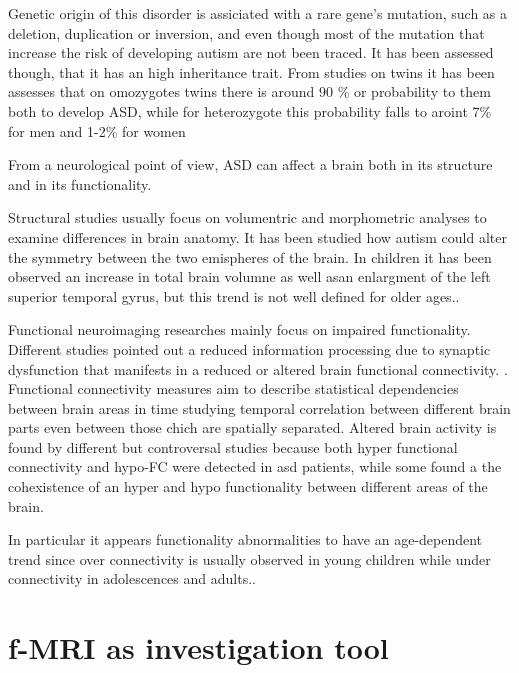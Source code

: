 \documentclass[10pt]{report}
\begin{document}
Genetic origin of this disorder is assiciated with a rare gene's mutation, such as a deletion, duplication or inversion, and even though most of the mutation that increase the risk of developing autism are not been traced.
It has been assessed though, that it has an high inheritance trait. From studies on twins it has been assesses that on omozygotes twins there is around 90 \% or probability to them both to develop ASD, while for heterozygote this probability falls to aroint 7\% for men and 1-2\% for women
\cite{freitag-2007}

From a neurological point of view, ASD can affect a brain both in its structure and in its functionality.

Structural studies usually focus on volumentric and morphometric analyses to examine differences in brain anatomy.
It has been studied how autism could alter the symmetry between the two emispheres \cite{postema2019} of the brain. In children it has been observed an increase in total brain volumne as well asan enlargment of the left superior temporal gyrus, but this trend is not well defined for older ages.\cite{riddler-2017}.


Functional neuroimaging researches mainly focus on impaired functionality. Different studies pointed out a reduced information processing due to synaptic dysfunction that manifests in a reduced or altered brain functional connectivity. \cite{spera-2019}.
Functional connectivity measures aim to describe statistical dependencies between brain areas in time studying temporal correlation between different brain parts even between those chich are spatially separated.
Altered brain activity is found by different but controversal studies because both hyper functional connectivity and hypo-FC were detected in asd patients, while some found a the cohexistence of an hyper and hypo functionality between different areas of the brain.

In particular it appears functionality abnormalities to have an age-dependent trend since over connectivity is usually observed in young children while under connectivity in adolescences and adults.\cite{supekar-2013}.

\section{f-MRI as investigation tool}
\end{document}
